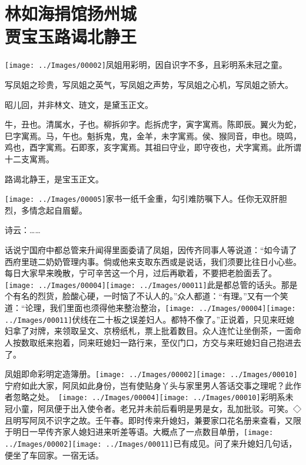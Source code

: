 

\chapter{林如海捐馆扬州城\\贾宝玉路谒北静王}\label{part0018_split_000.htmlux5cux23calibre_pb_0}

{\texttt{[image: ../Images/00002]}凤姐用彩明，因自识字不多，且彩明系未冠之童。}

{写凤姐之珍贵，写凤姐之英气，写凤姐之声势，写凤姐之心机，写凤姐之骄大。}

{昭儿回，并非林文、琏文，是黛玉正文。}

{牛，丑也。清属水，子也。柳拆卯字。彪拆虎字，寅字寓焉。陈即辰。翼火为蛇，巳字寓焉。马，午也。魁拆鬼，鬼，金羊，未字寓焉。侯、猴同音，申也。晓鸣，鸡也，酉字寓焉。石即豕，亥字寓焉。其祖曰守业，即守夜也，犬字寓焉。此所谓十二支寓焉。}

{路谒北静王，是宝玉正文。}

{\texttt{[image: ../Images/00005]}家书一纸千金重，勾引难防嘱下人。任你无双肝胆烈，多情念起自眉颦。}

诗云：\ldots{}\ldots{}

话说宁国府中都总管来升闻得里面委请了凤姐，因传齐同事人等说道：``如今请了西府里琏二奶奶管理内事。倘或他来支取东西或是说话，我们须要比往日小心些。每日大家早来晚散，宁可辛苦这一个月，过后再歇着，不要把老脸面丢了。{\texttt{[image: ../Images/00004]}\texttt{[image: ../Images/00011]}\footnotesize \kaishu 此是都总管的话头。}那是个有名的烈货，脸酸心硬，一时恼了不认人的。''众人都道：``有理。''又有一个笑道：``论理，我们里面也须得他来整治整治，{\texttt{[image: ../Images/00004]}\texttt{[image: ../Images/00011]}\footnotesize \kaishu 伏线在二十板之误差妇人。}都特不像了。''正说着，只见来旺媳妇拿了对牌，来领取呈文、京榜纸札，票上批着数目。众人连忙让坐倒茶，一面命人按数取纸来抱着，同来旺媳妇一路行来，至仪门口，方交与来旺媳妇自己抱进去了。

凤姐即命彩明定造簿册。{{\texttt{[image: ../Images/00002]}\texttt{[image: ../Images/00010]}\footnotesize \kaishu 宁府如此大家，阿凤如此身份，岂有使贴身丫头与家里男人答话交事之理呢？此作者忽略之处。　}\texttt{[image: ../Images/00004]}\texttt{[image: ../Images/00010]}\footnotesize \kaishu 彩明系未冠小童，阿凤便于出入使令者。老兄并未前后看明是男是女，乱加批驳。可笑。◇{且明写阿凤不识字之故。壬午春。}}即时传来升媳妇，兼要家口花名册来查看，又限于明日一早传齐家人媳妇进来听差等语。大概点了一点数目单册，{\texttt{[image: ../Images/00002]}\texttt{[image: ../Images/00011]}\footnotesize \kaishu 已有成见。}问了来升媳妇几句话，便坐了车回家。一宿无话。

